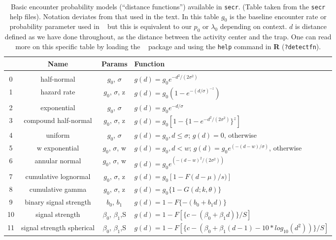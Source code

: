 \begin{table}[ht]
\centering
\caption{
  Basic encounter probability models (``distance functions'')
 available in \mbox{\tt secr}.  (Table taken from
  the 
\mbox{\tt secr}
  help files). Notation deviates from that used in the text.
  In this table $g_{0}$ is the baseline encounter rate or probability
  parameter used in \secr~ but this is equivalent to our $p_{0}$ or
  $\lambda_{0}$ depending on context. $d$ is distance defined as we have done throughout,
  as the distance between the activity center and the trap.
  One can read more on this specific table by loading the \secr~ package and using the
  {\tt help} command in {\bf R} ({\tt ?detectfn}).
}
\begin{tabular}{cccl}
\hline \hline
 & Name & Params & Function  \\ \hline
 \\
0 & half-normal &$g_0$, $\sigma$          &  $g(d) = g_0 e^{-d^2 / (2  \sigma^2)}$  \\
1 &hazard rate  & $g_0$, $\sigma$, z      &  $g(d) = g_0 (1 - e^{-(d / \sigma) ^{-z} })$ \\
2 &exponential   &$g_0$, $\sigma$    &  $g(d) = g_0 e^{- d / \sigma}$ \\
3 &compound half-normal  & $g_0$, $\sigma$, z & $g(d) = g_0 [1 - \{1 - e^{-d^2 /(2 \sigma^2)}\}^z]$ \\
4 &uniform     & $g_0$, $\sigma$     &
\parbox[t]{2in}{ $g(d) = g_{0}, d \leq \sigma$; \\
                 $g(d)= 0$, otherwise
} \\
5 &w exponential            & $g_0$, $\sigma$, w &
\parbox[t]{2in}{ $g(d) = g_{0}, d < w$; \\
                 $g(d) = g_{0} e^{(- (d - w) / \sigma)}$, otherwise
} \\
6 &annular normal           & $g_0$, $\sigma$, w & $g(d) = g_0 e^{(-(d-w)^2 / (2 \sigma^2))}$ \\
7 &cumulative lognormal     & $g_0$, $\sigma$, z & $g(d) = g_0 [1 -F{(d-\mu)/s)}]$  \\
8 &cumulative gamma         & $g_0$, $\sigma$, z  & $g(d) = g_0 \{ 1 - G (d; k,  \theta) \}$  \\
9 &binary signal strength   & $b_0$, $b_1$       & $g(d) = 1 - F \{- (b_0 + b_1 d) \}$ \\
10&signal strength          & $\beta_0$, $\beta_1$,S  &
  $g(d) = 1 - F[ \{c - (\beta_0 + \beta_1 d)\} / S]$  \\
11&signal strength spherical&  $\beta_0$, $\beta_1$,S & 
\parbox[t]{2in}{ $g(d) = 1 - F[\{c - (\beta_0 + \beta_1(d-1)- 10 * log_{10} ( d^2 ) ) \} / S]$ 
} \\ \hline
\end{tabular}
\label{covariates.tab.detmodels}
\end{table}


